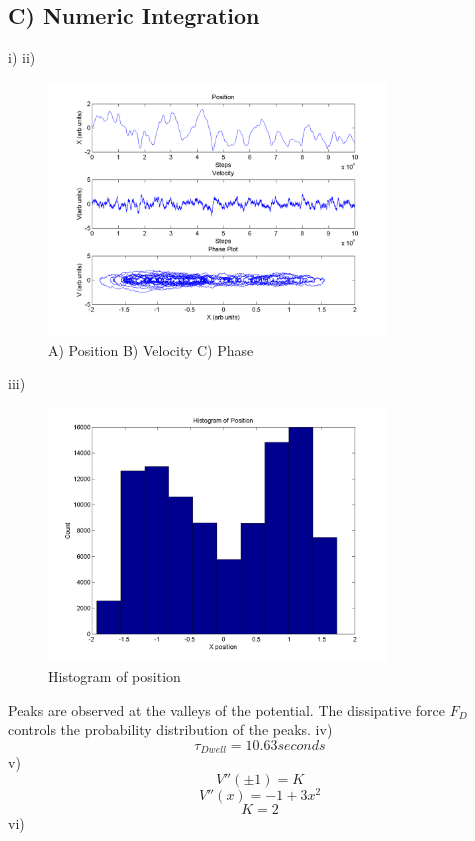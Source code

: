 \documentclass[paper=a4, fontsize=12pt]{scrartcl} %
\numberwithin{equation}{section} %
\numberwithin{figure}{section} %
\numberwithin{table}{section} %
\begin{document}
\subsection*{\small{C) Numeric Integration}}
i)
ii)
\begin{figure}[H]
  \centering
      \includegraphics[width=0.8\textwidth]{ParticleMotion.png}
  \caption{A) Position B) Velocity C) Phase}
\end{figure}
iii)
\begin{figure}[H]
  \centering
      \includegraphics[width=0.8\textwidth]{HIST.png}
  \caption{Histogram of position}
\end{figure}
Peaks are observed at the valleys of the potential. The dissipative force \(F_D\) controls the probability distribution of the peaks.
iv) 
\[\tau_{Dwell} = 10.63 seconds\]
v)
\[ V''(\pm1) = K\]
\[V''(x) = -1 + 3x^2\]
\[K = 2\]
vi)
\end{document}
